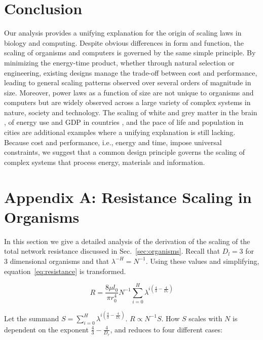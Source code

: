 \documentclass[12pt]{article}
\begin{document}
\section{Conclusion}

Our analysis provides a unifying explanation for the origin of scaling 
laws in biology and computing. Despite obvious differences in form and 
function, the scaling of organisms and computers is governed by the 
same simple principle.  By minimizing the energy-time product, whether 
through natural selection or engineering, existing designs manage the 
trade-off between cost and performance, leading to general scaling 
patterns observed over several orders of magnitude in size.  Moreover, 
power laws as a function of size are not unique to organisms and 
computers but are widely observed across a large variety of complex 
systems in nature, society and technology.  The scaling of white and 
grey matter in the brain \cite{zhang00}, of energy use and GDP in 
countries \cite{brown11}, and the pace of life and population in 
cities \cite{bettencourt07} are additional examples where a unifying 
explanation is still lacking.  Because cost and performance, i.e., 
energy and time, impose universal constraints, we suggest that a 
common design principle governs the scaling of complex systems that 
process energy, materials and information.


\section{Appendix A: Resistance Scaling in Organisms}
\label{sec:AppendixOrg}

In this section we give a detailed analysis of the derivation of the scaling of
the total network resistance discussed in Sec.~\ref{sec:organisms}. Recall
that $D_l = 3$ for $3$ dimensional organisms and that $\lambda^{-H}=N^{-1}$.
Using these values and simplifying, equation~\ref{eq:resistance} is
transformed. 

\begin{equation}
 R = \frac{8 \mu l_0}{\pi r_0^4} N^{-1} \sum_{i=0}^H \lambda^{i(\frac{4}{3} -\frac{4}{D_r})}
\end{equation}

Let the summand $S = \sum_{i=0}^H \lambda^{i(\frac{4}{3} -\frac{4}{D_r})}$. $R \propto
N^{-1} S$. How $S$ scales with $N$ is dependent on the exponent $\frac{4}{3} -
\frac{4}{D_r}$, and reduces to four different cases:
\end{document}
